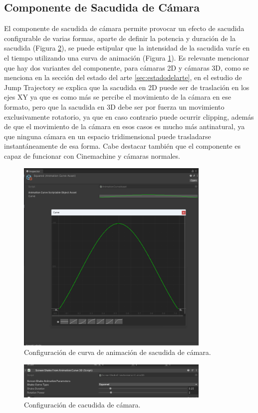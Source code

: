 \subsection{Componente de Sacudida de Cámara}
El componente de sacudida de cámara permite provocar un efecto de sacudida configurable de varias formas, aparte de definir la potencia y duración de la sacudida (Figura \ref{fig:screenshake2}), se puede 
estipular que la intensidad de la sacudida varíe en el tiempo utilizando una curva de animación (Figura \ref{fig:screenshake1}). Es relevante mencionar que hay dos variantes del componente, para cámaras 2D y 
cámaras 3D, como se menciona en la sección del estado del arte \ref{sec:estadodelarte}, en el estudio de Jump Trajectory\cite{Screenshake} se explica que la sacudida en 2D puede 
ser de traslación en los ejes XY ya que es como más se percibe el movimiento de la cámara en ese formato, pero que la sacudida en 3D debe ser por fuerza un movimiento 
exclusivamente rotatorio, ya que en caso contrario puede ocurrir clipping, además de que el movimiento de la cámara en esos casos es mucho más antinatural, ya que ninguna cámara
 en un espacio tridimensional puede trasladarse instantáneamente de esa forma. Cabe destacar también que el componente es capaz de funcionar con Cinemachine y cámaras normales. 

 
 \begin{figure}[H]
    \centering
    \includegraphics[width=350px,clip=true]{screenshakecurve.png}
    \caption{Configuración de curva de animación de sacudida de cámara.}
    \label{fig:screenshake1}
\end{figure}

\begin{figure}[H]
  \centering
    \includegraphics[width=350px,clip=true]{screenshake2.png}
  \caption{Configuración de cacudida de cámara.}
  \label{fig:screenshake2}
\end{figure}



